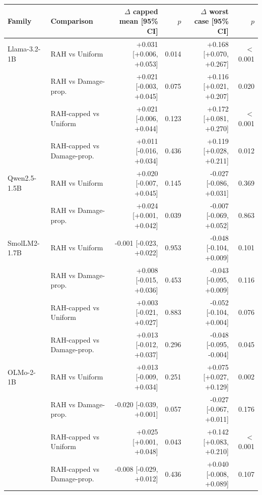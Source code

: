 \begin{tabular}{llrrrr}
\toprule
Family & Comparison & $\Delta$ capped mean [95\% CI] & $p$ & $\Delta$ worst case [95\% CI] & $p$ \\
\midrule
Llama-3.2-1B & RAH vs Uniform & +0.031 [+0.006, +0.053] & 0.014 & +0.168 [+0.070, +0.267] & $<$0.001 \\
 & RAH vs Damage-prop. & +0.021 [-0.003, +0.045] & 0.075 & +0.116 [+0.021, +0.207] & 0.020 \\
 & RAH-capped vs Uniform & +0.021 [-0.006, +0.044] & 0.123 & +0.172 [+0.081, +0.270] & $<$0.001 \\
 & RAH-capped vs Damage-prop. & +0.011 [-0.016, +0.034] & 0.436 & +0.119 [+0.028, +0.211] & 0.012 \\
\midrule
Qwen2.5-1.5B & RAH vs Uniform & +0.020 [-0.007, +0.045] & 0.145 & -0.027 [-0.086, +0.031] & 0.369 \\
 & RAH vs Damage-prop. & +0.024 [+0.001, +0.042] & 0.039 & -0.007 [-0.069, +0.052] & 0.863 \\
\midrule
SmolLM2-1.7B & RAH vs Uniform & -0.001 [-0.023, +0.022] & 0.953 & -0.048 [-0.104, +0.009] & 0.101 \\
 & RAH vs Damage-prop. & +0.008 [-0.015, +0.036] & 0.453 & -0.043 [-0.095, +0.009] & 0.116 \\
 & RAH-capped vs Uniform & +0.003 [-0.021, +0.027] & 0.883 & -0.052 [-0.104, +0.004] & 0.076 \\
 & RAH-capped vs Damage-prop. & +0.013 [-0.012, +0.037] & 0.296 & -0.048 [-0.095, -0.004] & 0.045 \\
\midrule
OLMo-2-1B & RAH vs Uniform & +0.013 [-0.009, +0.034] & 0.251 & +0.075 [+0.027, +0.129] & 0.002 \\
 & RAH vs Damage-prop. & -0.020 [-0.039, +0.001] & 0.057 & -0.027 [-0.067, +0.011] & 0.176 \\
 & RAH-capped vs Uniform & +0.025 [+0.001, +0.048] & 0.043 & +0.142 [+0.083, +0.210] & $<$0.001 \\
 & RAH-capped vs Damage-prop. & -0.008 [-0.029, +0.012] & 0.436 & +0.040 [-0.008, +0.089] & 0.107 \\
\bottomrule
\end{tabular}
